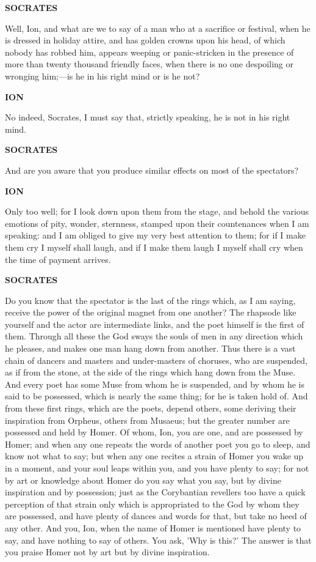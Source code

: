 \documentclass[11pt,letter]{article}
\begin{document}
\par \textbf{SOCRATES}
\par   Well, Ion, and what are we to say of a man who at a sacrifice or festival, when he is dressed in holiday attire, and has golden crowns upon his head, of which nobody has robbed him, appears weeping or panic-stricken in the presence of more than twenty thousand friendly faces, when there is no one despoiling or wronging him;—is he in his right mind or is he not?

\par \textbf{ION}
\par   No indeed, Socrates, I must say that, strictly speaking, he is not in his right mind.

\par \textbf{SOCRATES}
\par   And are you aware that you produce similar effects on most of the spectators?

\par \textbf{ION}
\par   Only too well; for I look down upon them from the stage, and behold the various emotions of pity, wonder, sternness, stamped upon their countenances when I am speaking:  and I am obliged to give my very best attention to them; for if I make them cry I myself shall laugh, and if I make them laugh I myself shall cry when the time of payment arrives.

\par \textbf{SOCRATES}
\par   Do you know that the spectator is the last of the rings which, as I am saying, receive the power of the original magnet from one another? The rhapsode like yourself and the actor are intermediate links, and the poet himself is the first of them. Through all these the God sways the souls of men in any direction which he pleases, and makes one man hang down from another. Thus there is a vast chain of dancers and masters and under-masters of choruses, who are suspended, as if from the stone, at the side of the rings which hang down from the Muse. And every poet has some Muse from whom he is suspended, and by whom he is said to be possessed, which is nearly the same thing; for he is taken hold of. And from these first rings, which are the poets, depend others, some deriving their inspiration from Orpheus, others from Musaeus; but the greater number are possessed and held by Homer. Of whom, Ion, you are one, and are possessed by Homer; and when any one repeats the words of another poet you go to sleep, and know not what to say; but when any one recites a strain of Homer you wake up in a moment, and your soul leaps within you, and you have plenty to say; for not by art or knowledge about Homer do you say what you say, but by divine inspiration and by possession; just as the Corybantian revellers too have a quick perception of that strain only which is appropriated to the God by whom they are possessed, and have plenty of dances and words for that, but take no heed of any other. And you, Ion, when the name of Homer is mentioned have plenty to say, and have nothing to say of others. You ask, 'Why is this?' The answer is that you praise Homer not by art but by divine inspiration.
\end{document}

